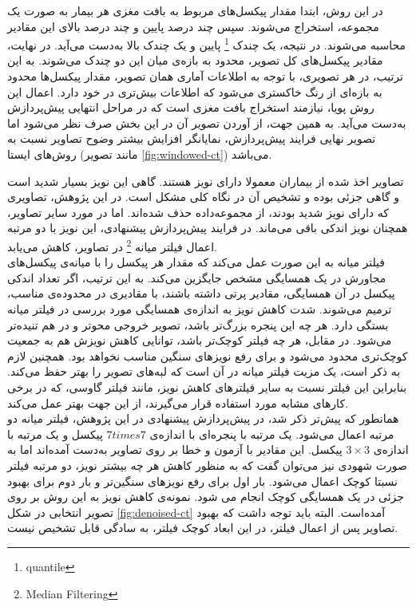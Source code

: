 در این روش، ابتدا مقدار پیکسل‌های مربوط به بافت مغزی هر بیمار به صورت یک مجموعه، استخراج می‌شوند.
سپس چند درصد پایین و چند درصد بالای این مقادیر محاسبه می‌شوند.
در نتیجه، یک چندک
\footnote{quantile} 
پایین و یک چندک بالا به‌دست می‌آید.
در نهایت، مقادیر پیکسل‌های کل تصویر، محدود به بازه‌ی میان این دو چندک می‌شوند.
به این ترتیب، در هر تصویری، با توجه به اطلاعات آماری همان تصویر، 
مقدار پیکسل‌ها محدود به بازه‌ای از رنگ خاکستری می‌شود که اطلاعات بیش‌تری در خود دارد.
اعمال این روش پویا، نیازمند استخراج بافت مغزی است که در مراحل انتهایی پیش‌پردازش به‌دست می‌آید.
به همین جهت، از آوردن تصویر آن در این بخش صرف نظر می‌شود
اما تصویر نهایی فرایند پیش‌پردازش، نمایانگر افزایش بیشتر وضوح 
تصاویر نسبت به روش‌های ایستا (مانند تصویر \ref{fig:windowed-ct}) می‌باشد.\\


تصاویر اخذ شده از بیماران معمولا دارای نویز هستند.
گاهی این نویز بسیار شدید است و گاهی جزئی بوده و تشخیص آن در نگاه کلی مشکل است.
در این پژوهش، تصاویری که دارای نویز شدید بودند، از مجموعه‌داده حذف شده‌اند.
اما در مورد سایر تصاویر، همچنان نویز اندکی باقی می‌ماند.
در فرایند پیش‌پردازش پیشنهادی، این نویز با دو مرتبه اعمال فیلتر میانه
\footnote{Median Filtering}
در تصاویر، کاهش می‌یابد.\\

فیلتر میانه به این صورت عمل می‌کند که مقدار هر پیکسل را 
با میانه‌ی پیکسل‌های مجاورش در یک همسایگی مشخص جایگزین می‌کند.
به این ترتیب، اگر تعداد اندکی پیکسل در آن همسایگی، مقادیر پرتی داشته باشند، با مقادیری در محدوده‌ی مناسب، ترمیم می‌شوند.
شدت کاهش نویز به اندازه‌ی همسایگی مورد بررسی در فیلتر میانه بستگی دارد.
هر چه این پنجره بزرگ‌تر باشد، تصویر خروجی محو‌تر و در هم تنیده‌تر
می‌شود.
در مقابل، هر چه فیلتر کوچک‌تر باشد، توانایی کاهش نویزش هم به جمعیت کوچک‌تری محدود می‌شود و برای رفع نویز‌های سنگین مناسب نخواهد بود.
همچنین لازم به ذکر است، یک مزیت فیلتر میانه در آن است که لبه‌های تصویر را بهتر حفظ می‌کند.
بنابراین این فیلتر نسبت به سایر فیلتر‌های کاهش نویز، مانند فیلتر گاوسی، که در برخی کارهای مشابه مورد استفاده قرار می‌گیرند، از این جهت بهتر عمل می‌کند.\\

همانطور که پیش‌تر ذکر شد، در پیش‌پردازش پیشنهادی در این پژوهش، فیلتر میانه دو مرتبه اعمال می‌شود. 
یک مرتبه با پنجره‌ای با اندازه‌ی $7times7$ پیکسل و یک مرتبه با اندازه‌ی $3\times3$ پیکسل.
این مقادیر با آزمون و خطا بر روی تصاویر به‌دست آمده‌اند اما به صورت شهودی نیز می‌توان گفت که به منظور کاهش هر چه بیشتر نویز، دو مرتبه فیلتر نسبتا کوچک اعمال می‌شود.
بار اول برای رفع نویز‌های سنگین‌تر و بار دوم برای بهبود جزئی در یک همسایگی کوچک انجام می شود.
نمونه‌ی کاهش نویز به این روش بر روی تصویر انتخابی 
در شکل
\ref{fig:denoised-ct}
آمده‌است.
البته باید توجه داشت که بهبود تصاویر پس از اعمال فیلتر، در این ابعاد کوچک فیلتر، به سادگی قابل تشخیص نیست.

